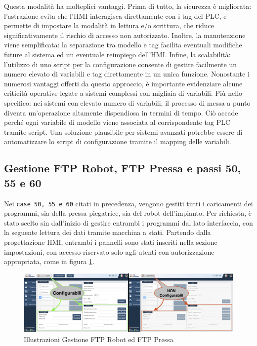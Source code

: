 Questa modalità ha molteplici vantaggi. Prima di tutto, la sicurezza è migliorata: l'astrazione evita che l'HMI interagisca direttamente con i tag del PLC, e permette di impostare la modalità in lettura e/o scrittura, che riduce significativamente il rischio di accesso non autorizzato. Inoltre, la manutenzione viene semplificata: la separazione tra modello e tag facilita eventuali modifiche future al sistema ed un eventuale reimpiego dell'HMI. Infine, la scalabilità: l’utilizzo di uno script per la configurazione consente di gestire facilmente un numero elevato di variabili e tag direttamente in un unica funzione. Nonostante i numerosi vantaggi offerti da questo approccio, è importante evidenziare alcune criticità operative legate a sistemi complessi con migliaia di variabili. Più nello specifico: nei sistemi con elevato numero di variabili, il processo di messa a punto diventa un'operazione altamente dispendiosa in termini di tempo. Ciò accade perché ogni variabile di modello viene associata al corrispondente tag PLC tramite script. Una soluzione plausibile per sistemi avanzati potrebbe essere di automatizzare lo script di configurazione tramite il mapping delle variabili.

\subsection{Gestione FTP Robot, FTP Pressa e passi 50, 55 e 60}
Nei \verb|case 50, 55 e 60| citati in precedenza, vengono gestiti tutti i caricamenti dei programmi, sia della pressa piegatrice, sia del robot dell'impianto. Per richiesta, è stato scelto sin dall'inizio di gestire entrambi i programmi dal lato interfaccia, con la seguente lettura dei dati tramite macchina a stati. Partendo dalla progettazione HMI, entrambi i pannelli sono stati inseriti nella sezione impostazioni, con accesso riservato solo agli utenti con autorizzazione appropriata, come in figura \ref{fig:FTP.png}.
\begin{figure} [ht]
    \centering
    \includegraphics[width=\linewidth]{Immagini/FTP.png}
    \caption{Illustrazioni Gestione FTP Robot ed FTP Pressa}
    \label{fig:FTP.png}
\end{figure}


